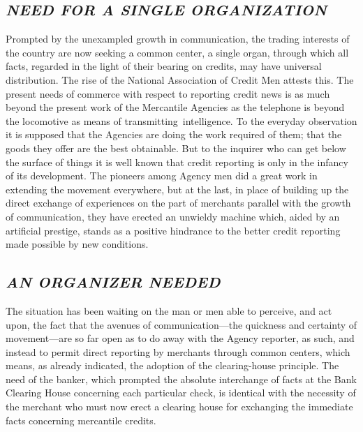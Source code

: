 \documentclass[openany,nobib]{tufte-book}
\begin{document}
\hypertarget{need-for-a-single-organization}{%
\subsection{\texorpdfstring{\emph{NEED FOR A SINGLE
ORGANIZATION}}{NEED FOR A SINGLE ORGANIZATION}}\label{need-for-a-single-organization}}

Prompted by the unexampled growth in communication, the trading
interests of the country are now seeking a common center, a single
organ, through which all facts, regarded in the light of their bearing
on credits, may have universal distribution. The rise of the National
Association of Credit Men attests this. The present needs of commerce
with respect to reporting credit news is as much beyond the present work
of the Mercantile Agencies as the telephone is beyond the locomotive as
means of transmitting~intelligence. To the everyday observation it is
supposed that the Agencies are doing the work required of them; that the
goods they offer are the best obtainable. But to the inquirer who can
get below the surface of things it is well known that credit reporting
is only in the infancy of its development. The pioneers among Agency men
did a great work in extending the movement everywhere, but at the last,
in place of building up the direct exchange of experiences on the part
of merchants parallel with the growth of communication, they have
erected an unwieldy machine which, aided by an artificial prestige,
stands as a positive hindrance to the better credit reporting made
possible by new conditions.~

\hypertarget{an-organizer-needed}{%
\subsection{\texorpdfstring{\emph{AN ORGANIZER
NEEDED}}{AN ORGANIZER NEEDED}}\label{an-organizer-needed}}

The situation has been waiting on the man or men able to perceive, and
act upon, the fact that the avenues of communication---the quickness and
certainty of movement---are so far open as to do away with the Agency
reporter, as such, and instead to permit direct reporting by merchants
through common centers, which means, as already indicated, the adoption
of the clearing-house principle. The need of the banker, which prompted
the absolute interchange of facts at the Bank Clearing House concerning
each particular check, is identical with the necessity of the merchant
who must now erect a clearing house for exchanging the immediate facts
concerning mercantile credits.~
\end{document}
